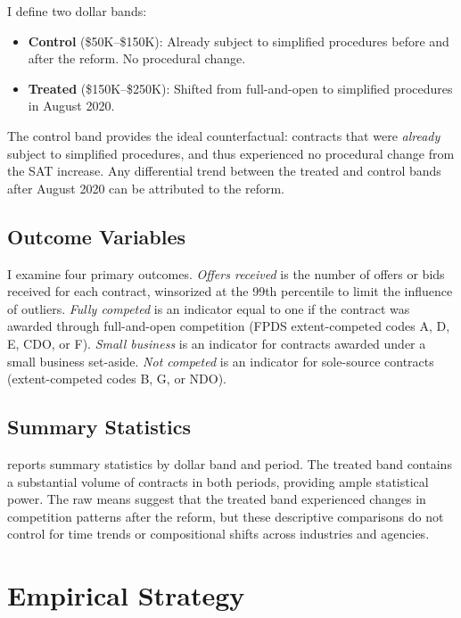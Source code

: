 \documentclass[12pt]{article}
\begin{document}
I define two dollar bands:
\begin{itemize}
  \item \textbf{Control} (\$50K--\$150K): Already subject to simplified procedures before and after the reform. No procedural change.
  \item \textbf{Treated} (\$150K--\$250K): Shifted from full-and-open to simplified procedures in August 2020.
\end{itemize}

The control band provides the ideal counterfactual: contracts that were \textit{already} subject to simplified procedures, and thus experienced no procedural change from the SAT increase. Any differential trend between the treated and control bands after August 2020 can be attributed to the reform.

\subsection{Outcome Variables}

I examine four primary outcomes. \textit{Offers received} is the number of offers or bids received for each contract, winsorized at the 99th percentile to limit the influence of outliers. \textit{Fully competed} is an indicator equal to one if the contract was awarded through full-and-open competition (FPDS extent-competed codes A, D, E, CDO, or F). \textit{Small business} is an indicator for contracts awarded under a small business set-aside. \textit{Not competed} is an indicator for sole-source contracts (extent-competed codes B, G, or NDO).

\subsection{Summary Statistics}



 reports summary statistics by dollar band and period. The treated band contains a substantial volume of contracts in both periods, providing ample statistical power. The raw means suggest that the treated band experienced changes in competition patterns after the reform, but these descriptive comparisons do not control for time trends or compositional shifts across industries and agencies.

\section{Empirical Strategy}
\end{document}
